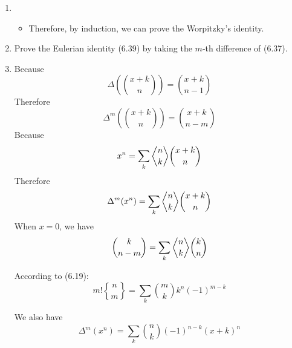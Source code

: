 \documentclass[12pt,a4paper]{article}
\makeatletter
\newtheorem*{solution}{Solution}
\theoremstyle{definition}
\def\bangle{ \atopwithdelims \langle \rangle}
\renewenvironment{solution}[1][Solution] {\par\pushQED{\qed}\normalfont\topsep6\p@\@plus6\p@\relax\trivlist\item[\hskip\labelsep\bfseries#1\@addpunct{.}]\ignorespaces}{\popQED\endtrivlist\@endpefalse} \makeatother
\makeatother
\begin{document}
\begin{enumerate}
\begin{solution}
\begin{itemize}
        	    \item 
        	        Therefore, by induction, we can prove the Worpitzky's identity. 
        	\end{itemize}
        \end{solution}
    \item 
        Prove the Eulerian identity (6.39) by taking the $m$-th difference of (6.37).
        \begin{solution}
        	Because
        	\begin{equation*}
        	    \Delta(\binom{x+k}{n})=\binom{x+k}{n-1}
        	\end{equation*}
        	Therefore
        	\begin{equation*}
        	    \Delta^m(\binom{x+k}{n})=\binom{x+k}{n-m}
        	\end{equation*}
        	Because
        	\begin{equation*}
        	    x^n=\sum_k {n \bangle k}\binom{x+k}{n}
        	\end{equation*}
        	Therefore
        	\begin{equation*}
        	    \Delta^m(x^n)=\sum_{k} {n \bangle k}\binom{x+k}{n}
        	\end{equation*}
        	When $x=0$, we have
        	\begin{equation*}
        	    \binom{k}{n-m}=\sum_{k}{n \bangle k}\binom{k}{n}
        	\end{equation*}
        	
        	According to (6.19):
        	\begin{equation*}
        	    m!{n \brace m}=\sum_k \binom{m}{k}k^n(-1)^{m-k}
        	\end{equation*}
        	
        	We also have
        	\begin{equation*}
        	    \Delta^m (x^n)=\sum_{k} \binom{n}{k} (-1)^{n-k} (x+k)^n
        	\end{equation*}
        	

\end{solution}
\end{enumerate}
\end{document}
